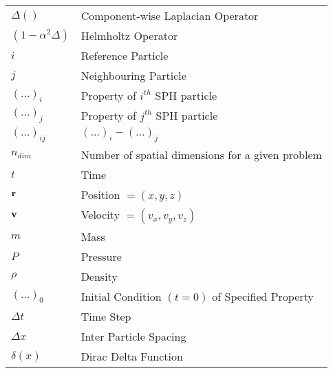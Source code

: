 \begin{longtable}{ll}
$\Delta ()$                    & Component-wise Laplacian Operator                                           \\
$(1 - \alpha^2 \Delta)$        & Helmholtz Operator                                                          \\
$i$                            & Reference Particle                                                          \\
$j$                            & Neighbouring Particle                                                       \\
$(...)_{i}$                    & Property of $i^{th}$ SPH particle                                           \\
$(...)_{j}$                    & Property of $j^{th}$ SPH particle                                           \\
$(...)_{ij}$                   & $(...)_{i} - (...)_{j}$                                                     \\
$n_{dim}$                      & Number of spatial dimensions for a given problem                            \\
$t$                            & Time                                                                        \\
$\mathbf{r}$                     & Position $=(x, y, z)$                                                       \\
$\mathbf{v}$                     & Velocity $=(v_x, v_y, v_z)$                                                 \\
$m$                            & Mass                                                                        \\
$P$                            & Pressure                                                                    \\
$\rho$                         & Density                                                                     \\
$(...)_0$                      & Initial Condition $(t=0)$ of Specified Property                             \\
$\Delta t$                     & Time Step                                                                   \\
$\Delta x$                     & Inter Particle Spacing                                                      \\
$\delta (x)$                   & Dirac Delta Function                                                        \\

\end{longtable}
